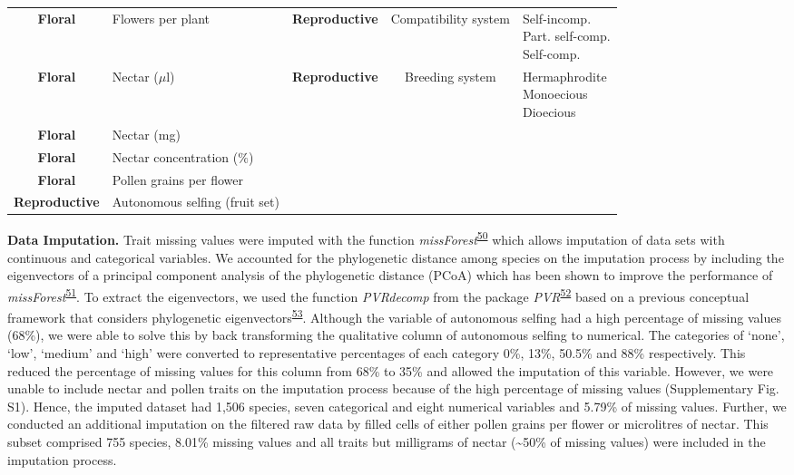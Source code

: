 \documentclass[12pt,a4paper,]{article}
\begin{document}
\begin{table}
\begin{tabular}[t]{>{}cl>{}ccl}
\addlinespace
\textbf{Floral} & Flowers per plant & \textbf{Reproductive} & Compatibility system & \makecell[l]{Self-incomp. \\ Part. self-comp. \\ Self-comp.}\\
\addlinespace
\textbf{Floral} & Nectar ($\mu$l) & \textbf{Reproductive} & Breeding system & \makecell[l]{Hermaphrodite \\ Monoecious \\ Dioecious}\\
\addlinespace
\textbf{Floral} & Nectar (mg) & \textbf{} &  & \\
\addlinespace
\textbf{Floral} & Nectar concentration ($\%$) & \textbf{} &  & \\
\addlinespace
\textbf{Floral} & Pollen grains per flower & \textbf{} &  & \\
\addlinespace
\textbf{Reproductive} & Autonomous selfing (fruit set) & \textbf{} &  & \\
\bottomrule
\end{tabular}
\end{table}

\doublespacing

\textbf{Data Imputation.} Trait missing values were imputed with the
function
\emph{missForest}\textsuperscript{\protect\hyperlink{ref-stekhoven2012}{50}}
which allows imputation of data sets with continuous and categorical
variables. We accounted for the phylogenetic distance among species on
the imputation process by including the eigenvectors of a principal
component analysis of the phylogenetic distance (PCoA) which has been
shown to improve the performance of
\emph{missForest}\textsuperscript{\protect\hyperlink{ref-penone2014}{51}}.
To extract the eigenvectors, we used the function \emph{PVRdecomp} from
the package
\emph{PVR}\textsuperscript{\protect\hyperlink{ref-santos2018}{52}} based
on a previous conceptual framework that considers phylogenetic
eigenvectors\textsuperscript{\protect\hyperlink{ref-diniz-filho2012}{53}}.
Although the variable of autonomous selfing had a high percentage of
missing values (68\%), we were able to solve this by back transforming
the qualitative column of autonomous selfing to numerical. The
categories of `none', `low', `medium' and `high' were converted to
representative percentages of each category 0\%, 13\%, 50.5\% and 88\%
respectively. This reduced the percentage of missing values for this
column from 68\% to 35\% and allowed the imputation of this variable.
However, we were unable to include nectar and pollen traits on the
imputation process because of the high percentage of missing values
(Supplementary Fig. S1). Hence, the imputed dataset had 1,506 species,
seven categorical and eight numerical variables and 5.79\% of missing
values. Further, we conducted an additional imputation on the filtered
raw data by filled cells of either pollen grains per flower or
microlitres of nectar. This subset comprised 755 species, 8.01\% missing
values and all traits but milligrams of nectar (\textasciitilde{}50\% of
missing values) were included in the imputation process.
\end{document}
